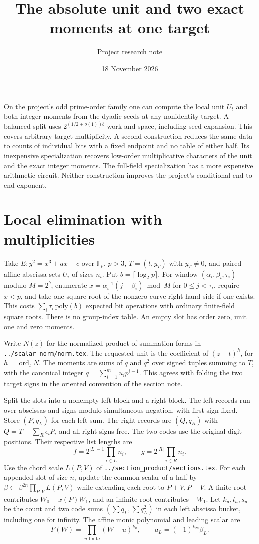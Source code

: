 \documentclass[11pt]{article}
\title{The absolute unit and two exact moments at one target}
\author{Project research note}
\date{18 November 2026}
\newcommand{\F}{\mathbb F}
\newcommand{\ord}{\operatorname{ord}}
\begin{document}
\maketitle

On the project's odd prime-order family one can compute the local
unit $U_t$ and both integer moments from the dyadic seeds at any
nonidentity target. A balanced split uses $2^{(1/2+o(1))b}$ work
and space, including seed expansion. This covers arbitrary target
multiplicity. A second construction reduces the same data to counts
of individual bits with a fixed endpoint and no table of either
half. Its inexpensive specialization recovers low-order
multiplicative characters of the unit and the exact integer moments.
The full-field specialization has a more expensive arithmetic
circuit. Neither construction improves the project's conditional
end-to-end exponent.

\section{Local elimination with multiplicities}
Take $E:y^2=x^3+ax+c$ over $\F_p$, $p>3$,
$T=(t,y_T)$ with $y_T\ne0$, and paired affine abscissa sets
$U_i$ of sizes $n_i$. Put $b=\lceil\log_2 p\rceil$.
For window $(\alpha_i,\beta_i,\tau_i)$ modulo $M=2^b$, enumerate
$x=\alpha_i^{-1}(j-\beta_i)\bmod M$ for $0\le j<\tau_i$,
require $x<p$, and take one square root of the nonzero curve
right-hand side if one exists. This costs
$\sum_i\tau_i\,\mathrm{poly}(b)$ expected bit operations with
ordinary finite-field square roots. There is no group-index table.
An empty slot has order zero, unit one and zero moments.

Write $N(z)$ for the normalized product of summation forms in
\texttt{../scalar\_norm/norm.tex}. The requested unit is the
coefficient of $(z-t)^h$, for $h=\ord_t N$. The moments are sums of
$q$ and $q^2$ over signed tuples summing to $T$, with the canonical
integer $q=\sum_{i=1}^m u_i p^{i-1}$. This agrees with folding
the two target signs in the oriented convention of the section note.

Split the slots into a nonempty left block and a right block.
The left records run over abscissas and signs modulo simultaneous
negation, with first sign fixed. Store $(P,q_L)$ for each left
sum. The right records are $(Q,q_R)$ with $Q=T+\sum_R\epsilon_iP_i$
and all right signs free. The two codes use the original digit
positions. Their respective list lengths are
\[
 f=2^{|L|-1}\prod_{i\in L}n_i,\qquad
 g=2^{|R|}\prod_{i\in R}n_i .
\]
Use the chord scale $L(P,V)$ of \texttt{../section\_product/sections.tex}.
For each appended slot of size $n$, update the common scalar of
a half by $\beta\gets\beta^{2n}\prod_{P,V}L(P,V)$ while extending
each root to $P+V,P-V$. A finite root contributes $W_0-x(P)W_1$,
and an infinite root contributes $-W_1$.
Let $k_u,l_u,s_u$ be the count and two code sums
$(\sum q_L,\sum q_L^2)$ in each left abscissa bucket, including
one for infinity. The affine monic polynomial and leading scalar are
\[
 F(W)=\prod_{u\text{ finite}}(W-u)^{k_u},\qquad
 a_L=(-1)^{k_\infty}\beta_L.
\]
\end{document}
